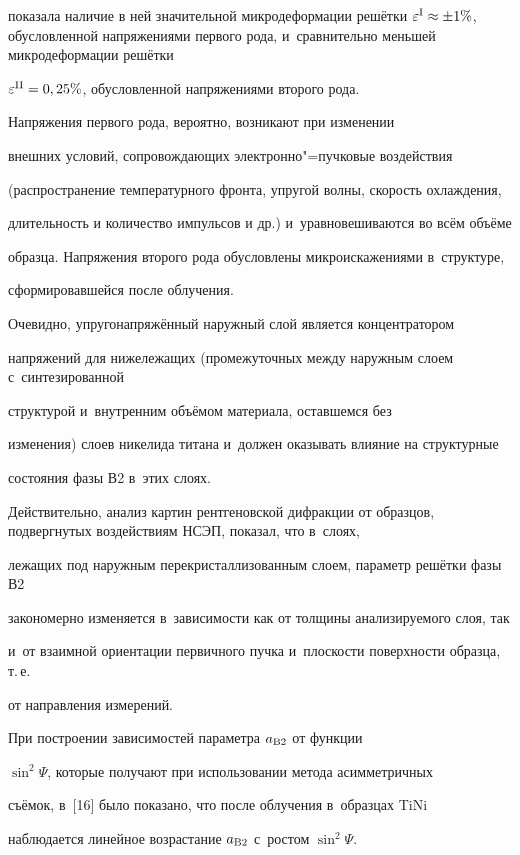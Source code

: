 показала наличие в ней значительной микродеформации решётки $\varepsilon

^{\rm I}\approx \pm 1{\%}$, обусловленной напряжениями первого рода, и~сравнительно меньшей микродеформации решётки

$\varepsilon^{\rm II}= 0,25{\%}$, обусловленной напряжениями второго рода.

Напряжения первого рода, вероятно, возникают при изменении

внешних условий, сопровождающих электронно"=пучковые воздействия

(распространение температурного фронта, упругой волны, скорость охлаждения,

длительность и количество импульсов и др.) и~уравновешиваются во всём объёме

образца. Напряжения второго рода обусловлены микроискажениями в~структуре,

сформировавшейся после облучения.



Очевидно, упругонапряжённый наружный слой является концентратором

напряжений для нижележащих (промежуточных между наружным слоем с~синтезированной

структурой и~внутренним объёмом материала, оставшемся без

изменения) слоев никелида титана и~должен оказывать влияние на структурные

состояния фазы В2 в~этих слоях.

Действительно, анализ картин рентгеновской дифракции от образцов, подвергнутых воздействиям НСЭП, показал, что в~слоях,

лежащих под наружным перекристаллизованным слоем, параметр решётки фазы В2

закономерно изменяется в~зависимости как от толщины анализируемого слоя, так

и~от взаимной ориентации первичного пучка и~плоскости поверхности образца, т.\,е.

от направления измерений.



При построении зависимостей параметра $a_{\rm B2}$ от функции

$\sin^{2}\Psi $, которые получают при использовании метода асимметричных

съёмок, в~[16] было показано, что после облучения в~образцах TiNi

наблюдается линейное возрастание $a_{\rm B2}$ с~ростом $\sin ^{2}\Psi $.


